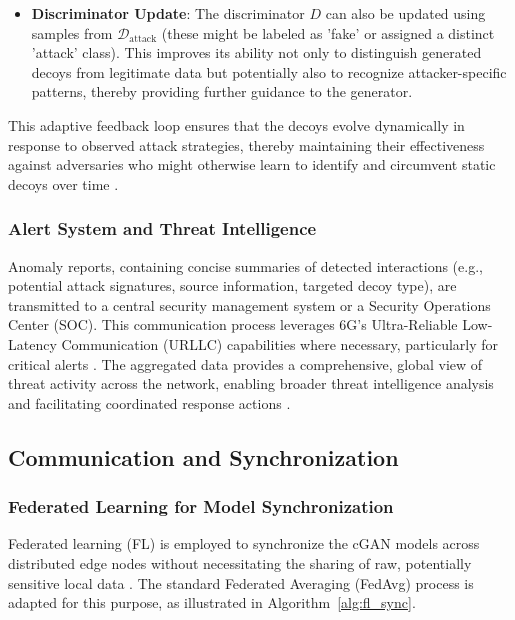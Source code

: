 \documentclass{article}
\begin{document}
\begin{itemize}[label=\textbf{\textbullet}]
    \item \textbf{Discriminator Update}: The discriminator \( D \) can also be updated using samples from \(\mathcal{D}_{\mathrm{attack}}\) (these might be labeled as 'fake' or assigned a distinct 'attack' class). This improves its ability not only to distinguish generated decoys from legitimate data but potentially also to recognize attacker-specific patterns, thereby providing further guidance to the generator.
\end{itemize}
This adaptive feedback loop ensures that the decoys evolve dynamically in response to observed attack strategies, thereby maintaining their effectiveness against adversaries who might otherwise learn to identify and circumvent static decoys over time \cite{Vemuri2024AdaptiveGAM}.

\subsubsection{Alert System and Threat Intelligence}
Anomaly reports, containing concise summaries of detected interactions (e.g., potential attack signatures, source information, targeted decoy type), are transmitted to a central security management system or a Security Operations Center (SOC). This communication process leverages 6G's Ultra-Reliable Low-Latency Communication (URLLC) capabilities where necessary, particularly for critical alerts \cite{Nguyen2021SecurityAPN}. The aggregated data provides a comprehensive, global view of threat activity across the network, enabling broader threat intelligence analysis and facilitating coordinated response actions \cite{Rodrguez2024ASSQ}.

\subsection{Communication and Synchronization}
\subsubsection{Federated Learning for Model Synchronization}
Federated learning (FL) is employed to synchronize the cGAN models across distributed edge nodes without necessitating the sharing of raw, potentially sensitive local data \cite{Das2022FGANFGI, Ferrag2023EdgeLFAD}. The standard Federated Averaging (FedAvg) process is adapted for this purpose, as illustrated in Algorithm~\ref{alg:fl_sync}.
\end{document}
